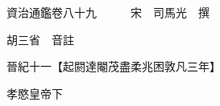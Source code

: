 










 


 
 


 

  
  
  
  
  





  
  
  
  
  
 
  

  

  
  
  



  

 
 

  
   




  

  
  


  　　資治通鑑卷八十九　　　宋　司馬光　撰

　　胡三省　音註

　　晉紀十一【起閼達閹茂盡柔兆困敦凡三年】

　　孝愍皇帝下

